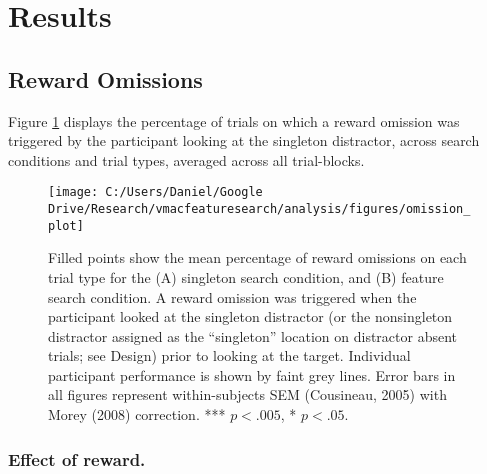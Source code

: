 \documentclass[jou, a4paper, noextraspace,floatsintext]{apa6}
\theoremstyle{definition}
\theoremstyle{definition}
\theoremstyle{definition}
\theoremstyle{remark}
\begin{document}
\section{Results}\label{results}

\subsection{Reward Omissions}\label{reward-omissions}

Figure \ref{fig:OmissionPlot} displays the percentage of trials on which
a reward omission was triggered by the participant looking at the
singleton distractor, across search conditions and trial types, averaged
across all trial-blocks.

\begin{figure}

{\centering \texttt{[image: C:/Users/Daniel/Google Drive/Research/vmacfeaturesearch/analysis/figures/omission\_plot]} 

}

\caption{Filled points show the mean percentage of reward
omissions on each trial type for the (A) singleton search condition, and
(B) feature search condition. A reward omission was triggered when the
participant looked at the singleton distractor (or the nonsingleton
distractor assigned as the \enquote{singleton} location on distractor
absent trials; see Design) prior to looking at the target. Individual
participant performance is shown by faint grey lines. Error bars in all
figures represent within-subjects SEM (Cousineau, 2005) with Morey
(2008) correction. *** \(p<.005\), * \(p<.05\).}\label{fig:OmissionPlot}
\end{figure}

\subsubsection{Effect of reward.}\label{effect-of-reward.}
\end{document}
